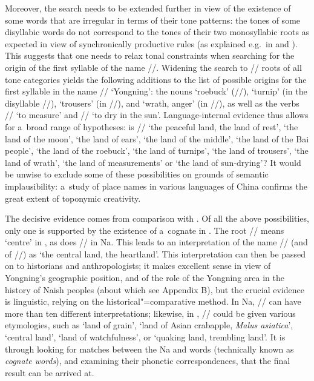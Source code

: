 Moreover, the search needs to be extended further in view of the existence of some words that are irregular in terms of their tone patterns: the tones of some disyllabic words do not correspond to the tones of their two monosyllabic roots as expected in view of synchronically {productive} rules (as explained e.g.\ in  and ). This suggests that one needs to relax tonal constraints when searching for the origin of the first syllable of the name //. Widening the search to // roots of all tone categories yields the following additions to the list of possible origins for the first syllable in the name // ‘Yongning': the nouns ‘roebuck' (//), ‘turnip' (in the disyllable //), ‘trousers' (in //), and ‘wrath, anger' (in //), as well as the verbs // ‘to measure' and // ‘to dry in the sun'. Language-internal evidence thus allows for a~broad range of hypotheses: is // ‘the peaceful land, the land of rest', ‘the land of the moon', ‘the land of ears', ‘the land of the middle', ‘the land of the Bai people', ‘the land of the roebuck', ‘the land of turnips', ‘the land of trousers', ‘the land of wrath', ‘the land of measurements' or ‘the land of sun-drying'? It would be unwise to exclude some of these possibilities on grounds of semantic implausibility: a~study of place names in various languages of China \citep{yangliquan2011} confirms the great extent of toponymic creativity.

The decisive evidence comes from comparison with . Of all the above possibilities, only one is supported by the existence of a~cognate in . The root // means ‘centre’ in , as does // in Na. This leads to an interpretation of the name // (and of  //) as ‘the central land, the heartland’. This interpretation can then be passed on to historians and anthropologists; it makes excellent sense in view of Yongning's geographic position, and of the role of the Yongning area in the history of {Naish} peoples (about which see Appendix B), but the crucial evidence is linguistic, relying on the historical"=comparative method. In Na, // can have more than ten different interpretations; likewise, in , // could be given various etymologies, such as ‘land of grain’, ‘land of Asian crabapple, \textit{Malus asiatica}’, ‘central land', ‘land of watchfulness', or ‘quaking land, trembling land'. It is through looking for matches between the Na and  words (technically known as \textit{cognate words}), and examining their phonetic correspondences, that the final result can be arrived at.


